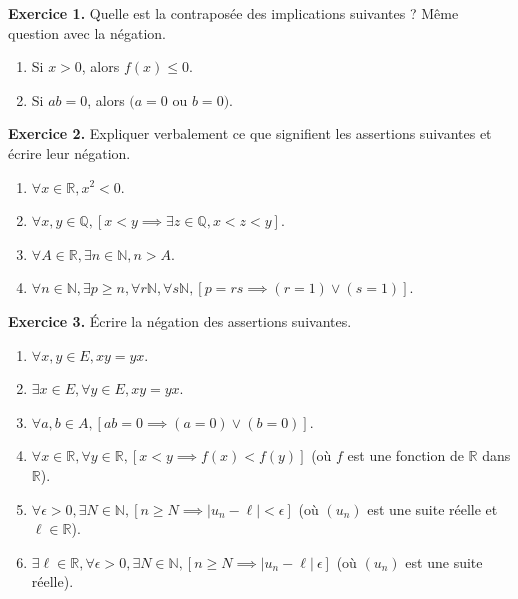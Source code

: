 \documentclass[a4paper, 10pt]{report}
\providecommand{\abs}[1]{\lvert#1\rvert}
\begin{document}
	
	\renewcommand{\headrule}{
		\color{lightgray} \par\noindent\rule{\textwidth}{2pt}
	}	
	\pagestyle{fancy}
	\fancyhf{}
	
	
	\vspace{5mm}
	\noindent
	\textbf{Exercice 1.} Quelle est la contraposée des implications
	suivantes ? Même question avec la négation.
	\begin{enumerate}[label=(\roman*)]
		\item Si $x > 0$, alors $f(x) \leq 0$.
		\item Si $ab = 0$, alors $(a = 0$ ou $b = 0)$.
	\end{enumerate}
	
	\vspace{5mm}
	\noindent
	\textbf{Exercice 2.} Expliquer verbalement ce que signifient les
	assertions suivantes et écrire leur négation.
	\begin{enumerate}[label=(\roman*)]
		\item $\forall x \in \mathbb{R}, x^2 < 0$.
		\item $\forall x,y \in \mathbb{Q}, [x < y \implies
			\exists z \in \mathbb{Q}, x < z < y]$.
		\item $\forall A \in \mathbb{R}, \exists n \in \mathbb{N},
			n > A$.
		\item $\forall n \in \mathbb{N}, \exists p \geq n,
			\forall r \mathbb{N}, \forall s \mathbb{N},
			[p = rs \implies (r = 1) \lor (s = 1)]$.
	\end{enumerate}
	
	\vspace{5mm}
	\noindent
	\textbf{Exercice 3.} Écrire la négation des assertions suivantes.
	\begin{enumerate}[label=(\roman*)]
		\item $\forall x,y \in E, xy = yx$.
		\item $\exists x \in E, \forall y \in E, xy = yx$.
		\item $\forall a,b \in A, [ab = 0 \implies
			(a = 0) \lor (b = 0)]$.
		\item $\forall x \in \mathbb{R}, \forall y \in \mathbb{R},
			[x < y \implies f(x) < f(y)]$ (où $f$ est une fonction
			de $\mathbb{R}$ dans $\mathbb{R}$).
		\item $\forall \epsilon > 0, \exists N \in \mathbb{N},
			[n \geq N \implies \abs{u_n - \ell} < \epsilon]$
			(où $(u_n)$ est une suite réelle et $\ell \in \mathbb{R}$).
		\item $\exists \ell \in \mathbb{R}, \forall \epsilon > 0,
			\exists N \in \mathbb{N}, [n \geq N \implies
			\abs{u_n - \ell} \ \epsilon]$
			(où $(u_n)$ est une suite réelle).
	\end{enumerate}
	
\end{document}
